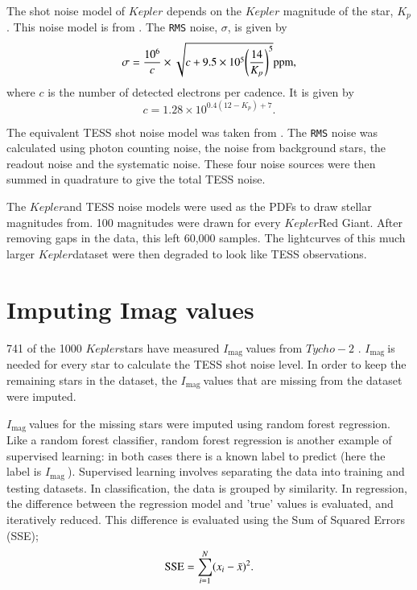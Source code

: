 \documentclass[a4paper,fleqn,usenatbib,useAMS]{mnras}
\newcommand{\kep}{\ensuremath{Kepler}\:}
\newcommand{\imag}{\ensuremath{I_{\textrm{mag}}\:}}
\begin{document}
The shot noise model of $Kepler$ depends on the $Kepler$ magnitude of the star, $K_{p}$. This noise model is from \citet{gilliland_initial_2010}. The \texttt{RMS} noise, $\sigma$, is given by
\begin{equation}
\sigma = \frac{10^{6}}{c} \times \sqrt{c+9.5 \times 10^{5}\Bigg(\frac{14}{K_{p}}\Bigg)^{5}}  {\rm ppm},
\label{eq:kep noise}
\end{equation}
where $c$ is the number of detected electrons per cadence. It is given by
\begin{equation}
c = 1.28 \times 10^{0.4(12-K_{p})+7} .
\end{equation}

The equivalent TESS shot noise model was taken from \citet{sullivan_transiting_2015}. The \texttt{RMS} noise was calculated using photon counting noise, the noise from background stars, the readout noise and the systematic noise. These four noise sources were then summed in quadrature to give the total TESS noise.

The \kep and TESS noise models were used as the PDFs to draw stellar magnitudes from. 100 magnitudes were drawn for every \kep Red Giant. After removing gaps in the data, this left 60,000 samples. The lightcurves of this much larger \kep dataset were then degraded to look like TESS observations.



\section{Imputing Imag values}
\label{sect: impute}

741 of the 1000 \kep stars have measured \imag values from $Tycho-2$ \citep{hog_tycho-2_2000}. \imag is needed for every star to calculate the TESS shot noise level. In order to keep the remaining stars in the dataset, the \imag values that are missing from the dataset were imputed.

\imag values for the missing stars were imputed using random forest regression. Like a random forest classifier, random forest regression is another example of supervised learning: in both cases there is a known label to predict (here the label is \imag). Supervised learning involves separating the data into training and testing datasets. In classification, the data is grouped by similarity. In regression, the difference between the regression model and 'true' values is evaluated, and iteratively reduced. This difference is evaluated using the Sum of Squared Errors (SSE);
\begin{equation}
{\rm SSE} = \sum_{i=1}^{N} (x_{i} - \bar{x})^{2}.
\end{equation}
\end{document}
